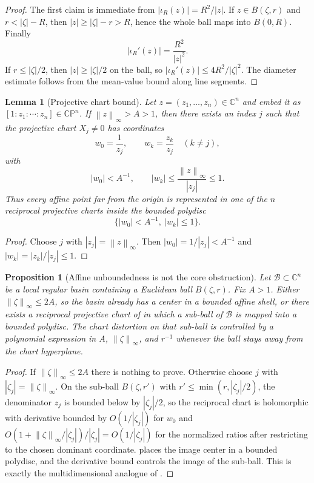 \documentclass[11pt]{article}
\newtheorem{proposition}[definition]{Proposition}
\newtheorem{lemma}[definition]{Lemma}
\newcommand{\C}{\mathbb C}
\newcommand{\B}{\mathcal B}
\newcommand{\norm}[1]{\left\lVert #1\right\rVert}
\begin{document}
\begin{proof}
The first claim is immediate from $|\iota_R(z)|=R^2/|z|$.  If $z\in B(\zeta,r)$ and $r<|\zeta|-R$, then $|z|\ge |\zeta|-r>R$, hence the whole ball maps into $B(0,R)$.  Finally
\[
        |\iota_R'(z)|=\frac{R^2}{|z|^2}.
\]
If $r\le |\zeta|/2$, then $|z|\ge |\zeta|/2$ on the ball, so $|\iota_R'(z)|\le4R^2/|\zeta|^2$.  The diameter estimate follows from the mean-value bound along line segments.
\end{proof}

\begin{lemma}[Projective chart bound]\label{lem:projective-chart}
Let $z=(z_1,\ldots,z_n)\in\C^n$ and embed it as $[1:z_1:\cdots:z_n]\in\mathbb{CP}^n$.  If $\norm z_\infty>A>1$, then there exists an index $j$ such that the projective chart $X_j\ne0$ has coordinates
\[
        w_0=\frac1{z_j},\qquad
        w_k=\frac{z_k}{z_j}\quad(k\ne j),
\]
with
\[
        |w_0|<A^{-1},\qquad |w_k|\le \frac{\norm z_\infty}{|z_j|}\le1.
\]
Thus every affine point far from the origin is represented in one of the $n$ reciprocal projective charts inside the bounded polydisc
\[
        \{|w_0|<A^{-1},\ |w_k|\le1\}.
\]
\end{lemma}

\begin{proof}
Choose $j$ with $|z_j|=\norm z_\infty$.  Then $|w_0|=1/|z_j|<A^{-1}$ and $|w_k|=|z_k|/|z_j|\le1$.
\end{proof}

\begin{proposition}[Affine unboundedness is not the core obstruction]\label{prop:location-reduction}
Let $\B\subset\C^n$ be a local regular basin containing a Euclidean ball $B(\zeta,r)$.  Fix $A>1$.  Either $\norm\zeta_\infty\le 2A$, so the basin already has a center in a bounded affine shell, or there exists a reciprocal projective chart of  in which a sub-ball of $\B$ is mapped into a bounded polydisc.  The chart distortion on that sub-ball is controlled by a polynomial expression in $A$, $\norm\zeta_\infty$, and $r^{-1}$ whenever the ball stays away from the chart hyperplane.
\end{proposition}

\begin{proof}
If $\norm\zeta_\infty\le2A$ there is nothing to prove.  Otherwise choose $j$ with $|\zeta_j|=\norm\zeta_\infty$.  On the sub-ball $B(\zeta,r')$ with $r'\le\min(r,|\zeta_j|/2)$, the denominator $z_j$ is bounded below by $|\zeta_j|/2$, so the reciprocal chart is holomorphic with derivative bounded by $O(1/|\zeta_j|)$ for $w_0$ and $O(1+\norm\zeta_\infty/|\zeta_j|)/|\zeta_j|=O(1/|\zeta_j|)$ for the normalized ratios after restricting to the chosen dominant coordinate.   places the image center in a bounded polydisc, and the derivative bound controls the image of the sub-ball.  This is exactly the multidimensional analogue of .
\end{proof}
\end{document}
